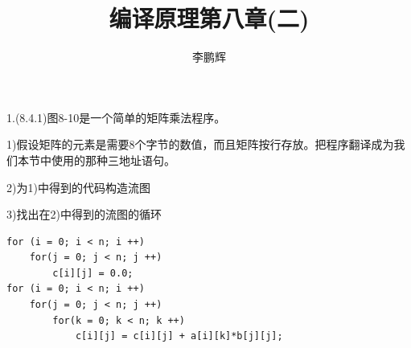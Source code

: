 \documentclass[a4paper, 16pt]{article}
\title{编译原理第八章(二)}
\author{李鹏辉}
\begin{document}
\maketitle

1.(8.4.1)图8-10是一个简单的矩阵乘法程序。

1)假设矩阵的元素是需要8个字节的数值，而且矩阵按行存放。把程序翻译成为我们本节中使用的那种三地址语句。

2)为1)中得到的代码构造流图

3)找出在2)中得到的流图的循环


\lstset{language=C}
\begin{lstlisting}
for (i = 0; i < n; i ++)
	for(j = 0; j < n; j ++)
		c[i][j] = 0.0;
for (i = 0; i < n; i ++)
	for(j = 0; j < n; j ++)
		for(k = 0; k < n; k ++)
			c[i][j] = c[i][j] + a[i][k]*b[j][j];

\end{lstlisting}
\end{document}
